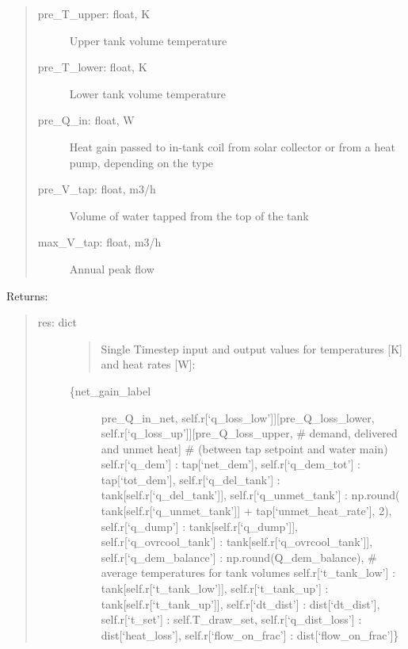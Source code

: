 \documentclass[letterpaper,10pt,english,openany]{sphinxmanual}
\begin{document}
\begin{fulllineitems}
\begin{fulllineitems}
\begin{quote}
\begin{description}
\item[{pre\_T\_upper: float, K}] \leavevmode
Upper tank volume temperature

\item[{pre\_T\_lower: float, K}] \leavevmode
Lower tank volume temperature

\item[{pre\_Q\_in: float, W}] \leavevmode
Heat gain passed to in-tank coil from solar collector
or from a heat pump, depending on the type

\item[{pre\_V\_tap: float, m3/h}] \leavevmode
Volume of water tapped from the top of the tank

\item[{max\_V\_tap: float, m3/h}] \leavevmode
Annual peak flow

\end{description}
\end{quote}

Returns:
\begin{quote}
\begin{description}
\item[{res: dict}] \leavevmode\begin{quote}

Single Timestep input and output values for temperatures {[}K{]}
and heat rates {[}W{]}:
\end{quote}
\begin{description}
\item[{\{net\_gain\_label}] \leavevmode{[}pre\_Q\_in\_net,                self.r{[}‘q\_loss\_low’{]}{]}{[}pre\_Q\_loss\_lower,                self.r{[}‘q\_loss\_up’{]}{]}{[}pre\_Q\_loss\_upper,                \# demand, delivered and unmet heat{]}
\# (between tap setpoint and water main)
self.r{[}‘q\_dem’{]} : tap{[}‘net\_dem’{]},                self.r{[}‘q\_dem\_tot’{]} : tap{[}‘tot\_dem’{]},                self.r{[}‘q\_del\_tank’{]} : tank{[}self.r{[}‘q\_del\_tank’{]}{]},                self.r{[}‘q\_unmet\_tank’{]} :                     np.round(                tank{[}self.r{[}‘q\_unmet\_tank’{]}{]} + tap{[}‘unmet\_heat\_rate’{]}, 2),                self.r{[}‘q\_dump’{]} : tank{[}self.r{[}‘q\_dump’{]}{]},                self.r{[}‘q\_ovrcool\_tank’{]} : tank{[}self.r{[}‘q\_ovrcool\_tank’{]}{]},                self.r{[}‘q\_dem\_balance’{]} : np.round(Q\_dem\_balance),                \# average temperatures for tank volumes
self.r{[}‘t\_tank\_low’{]} : tank{[}self.r{[}‘t\_tank\_low’{]}{]},                self.r{[}‘t\_tank\_up’{]} : tank{[}self.r{[}‘t\_tank\_up’{]}{]},                self.r{[}‘dt\_dist’{]} : dist{[}‘dt\_dist’{]},                self.r{[}‘t\_set’{]} : self.T\_draw\_set,                self.r{[}‘q\_dist\_loss’{]} : dist{[}‘heat\_loss’{]},
self.r{[}‘flow\_on\_frac’{]} : dist{[}‘flow\_on\_frac’{]}\}


\end{description}
\end{description}
\end{quote}
\end{fulllineitems}
\end{fulllineitems}
\end{document}
